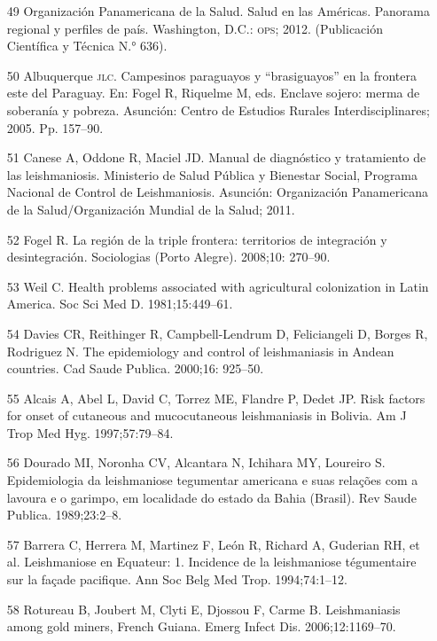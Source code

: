 \documentclass{article}
\begin{document}
\begin{itemize}
\item[49] Organización Panamericana de la Salud. Salud en las Américas.
Panorama regional y perfiles de país. Washington, D.C.: \textsc{ops}; 2012. (Publicación
Científica y Técnica N.° 636).

\item[50] Albuquerque \textsc{jlc}. Campesinos paraguayos y “brasiguayos” en la
frontera este del Paraguay. En: Fogel R, Riquelme M, eds. Enclave sojero: merma
de soberanía y pobreza. Asunción: Centro de Estudios Rurales Interdisciplinares;
2005. Pp. 157–90.

\item[51] Canese A, Oddone R, Maciel JD. Manual de diagnóstico y tratamiento
de las leishmaniosis. Ministerio de Salud Pública y Bienestar Social, Programa
Nacional de Control de Leishmaniosis. Asunción: Organización Panamericana de la
Salud/Organización Mundial de la Salud; 2011.

\item[52] Fogel R. La región de la triple frontera: territorios de
integración y desintegración. Sociologias (Porto Alegre). 2008;10: 270–90.

\item[53] Weil C. Health problems associated with agricultural colonization
in Latin America. Soc Sci Med D. 1981;15:449–61.

\item[54] Davies CR, Reithinger R, Campbell-Lendrum D, Feliciangeli D, Borges
R, Rodriguez N. The epidemiology and control of leishmaniasis in Andean
countries. Cad Saude Publica. 2000;16: 925–50.

\item[55] Alcais A, Abel L, David C, Torrez ME, Flandre P, Dedet JP. Risk
factors for onset of cutaneous and mucocutaneous leishmaniasis in Bolivia. Am J
Trop Med Hyg. 1997;57:79–84.

\item[56] Dourado MI, Noronha CV, Alcantara N, Ichihara MY, Loureiro S.
Epidemiologia da leishmaniose tegumentar americana e suas relações com a lavoura
e o garimpo, em localidade do estado da Bahia (Brasil). Rev Saude Publica.
1989;23:2–8.

\item[57] Barrera C, Herrera M, Martinez F, León R, Richard A, Guderian RH,
et al. Leishmaniose en Equateur: 1. Incidence de la leishmaniose tégumentaire
sur la façade pacifique. Ann Soc Belg Med Trop. 1994;74:1–12.

\item[58] Rotureau B, Joubert M, Clyti E, Djossou F, Carme B. Leishmaniasis
among gold miners, French Guiana. Emerg Infect Dis. 2006;12:1169–70.


\end{itemize}
\end{document}
